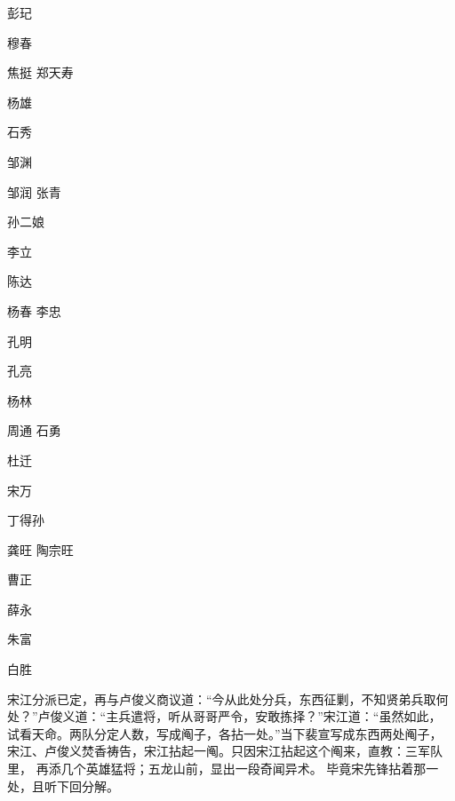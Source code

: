 彭玘

穆春

焦挺
郑天寿

杨雄

石秀

邹渊

邹润
张青

孙二娘

李立

陈达

杨春
李忠

孔明

孔亮

杨林

周通
石勇

杜迁

宋万

丁得孙

龚旺
陶宗旺

曹正

薛永

朱富

白胜

宋江分派已定，再与卢俊义商议道：“今从此处分兵，东西征剿，不知贤弟兵取何
处？”卢俊义道：“主兵遣将，听从哥哥严令，安敢拣择？”宋江道：“虽然如此，
试看天命。两队分定人数，写成阄子，各拈一处。”当下裴宣写成东西两处阄子，
宋江、卢俊义焚香祷告，宋江拈起一阄。只因宋江拈起这个阄来，直教：三军队里，
再添几个英雄猛将；五龙山前，显出一段奇闻异术。
毕竟宋先锋拈着那一处，且听下回分解。